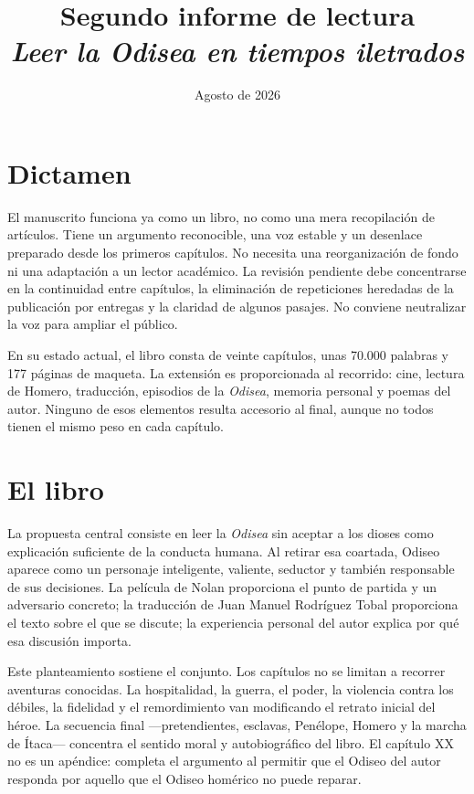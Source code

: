 \documentclass[12pt,a4paper]{article}
\title{Segundo informe de lectura\\[0.4em]\large\emph{Leer la Odisea en tiempos iletrados}}
\author{}
\date{Agosto de 2026}
\begin{document}
\maketitle

\section*{Dictamen}

El manuscrito funciona ya como un libro, no como una mera recopilación de artículos. Tiene un argumento reconocible, una voz estable y un desenlace preparado desde los primeros capítulos. No necesita una reorganización de fondo ni una adaptación a un lector académico. La revisión pendiente debe concentrarse en la continuidad entre capítulos, la eliminación de repeticiones heredadas de la publicación por entregas y la claridad de algunos pasajes. No conviene neutralizar la voz para ampliar el público.

En su estado actual, el libro consta de veinte capítulos, unas 70.000 palabras y 177 páginas de maqueta. La extensión es proporcionada al recorrido: cine, lectura de Homero, traducción, episodios de la \emph{Odisea}, memoria personal y poemas del autor. Ninguno de esos elementos resulta accesorio al final, aunque no todos tienen el mismo peso en cada capítulo.

\section*{El libro}

La propuesta central consiste en leer la \emph{Odisea} sin aceptar a los dioses como explicación suficiente de la conducta humana. Al retirar esa coartada, Odiseo aparece como un personaje inteligente, valiente, seductor y también responsable de sus decisiones. La película de Nolan proporciona el punto de partida y un adversario concreto; la traducción de Juan Manuel Rodríguez Tobal proporciona el texto sobre el que se discute; la experiencia personal del autor explica por qué esa discusión importa.

Este planteamiento sostiene el conjunto. Los capítulos no se limitan a recorrer aventuras conocidas. La hospitalidad, la guerra, el poder, la violencia contra los débiles, la fidelidad y el remordimiento van modificando el retrato inicial del héroe. La secuencia final ---pretendientes, esclavas, Penélope, Homero y la marcha de Ítaca--- concentra el sentido moral y autobiográfico del libro. El capítulo XX no es un apéndice: completa el argumento al permitir que el Odiseo del autor responda por aquello que el Odiseo homérico no puede reparar.
\end{document}
